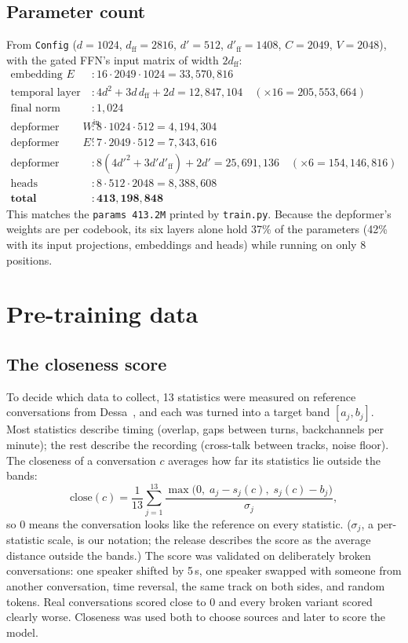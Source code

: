 \documentclass[10pt]{article}
\begin{document}
\subsection{Parameter count}
From \texttt{Config} ($d=1024$, $d_\text{ff}=2816$, $d'=512$, $d'_\text{ff}=1408$, $C=2049$, $V=2048$), with the gated FFN's input matrix of width $2d_\text{ff}$:
\begin{align*}
\text{embedding } E &: 16\cdot2049\cdot1024 = 33{,}570{,}816\\
\text{temporal layer} &: 4d^2+3d\,d_\text{ff}+2d = 12{,}847{,}104\quad(\times16 = 205{,}553{,}664)\\
\text{final norm} &: 1{,}024\\
\text{depformer input } W^\text{in} &: 8\cdot1024\cdot512 = 4{,}194{,}304\\
\text{depformer embedding } E' &: 7\cdot2049\cdot512 = 7{,}343{,}616\\
\text{depformer layer} &: 8(4d'^2+3d'd'_\text{ff})+2d' = 25{,}691{,}136\quad(\times6 = 154{,}146{,}816)\\
\text{heads} &: 8\cdot512\cdot2048 = 8{,}388{,}608\\
\textbf{total} &: \mathbf{413{,}198{,}848}
\end{align*}
This matches the \texttt{params 413.2M} printed by \texttt{train.py}. Because the depformer's weights are per codebook, its six layers alone hold 37\% of the parameters (42\% with its input projections, embeddings and heads) while running on only 8 positions.

\section{Pre-training data}
\label{sec:data}

\subsection{The closeness score}
To decide which data to collect, 13 statistics were measured on reference conversations from Dessa~\cite{dessa}, and each was turned into a target band $[a_j,b_j]$. Most statistics describe timing (overlap, gaps between turns, backchannels per minute); the rest describe the recording (cross-talk between tracks, noise floor). The closeness of a conversation $c$ averages how far its statistics lie outside the bands:
\begin{equation}
\mathrm{close}(c)=\frac{1}{13}\sum_{j=1}^{13}\frac{\max\big(0,\;a_j-s_j(c),\;s_j(c)-b_j\big)}{\sigma_j},
\end{equation}
so $0$ means the conversation looks like the reference on every statistic. ($\sigma_j$, a per-statistic scale, is our notation; the release describes the score as the average distance outside the bands.) The score was validated on deliberately broken conversations: one speaker shifted by 5\,s, one speaker swapped with someone from another conversation, time reversal, the same track on both sides, and random tokens. Real conversations scored close to 0 and every broken variant scored clearly worse. Closeness was used both to choose sources and later to score the model.
\end{document}
